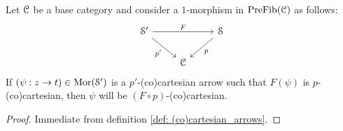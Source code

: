             \begin{proposition} \label{prop: (co)cartesian_arrows_under_1_morphisms_of_prefibrations}
                Let $\mathcal{C}$ be a base category and consider a $1$-morphism in $\mathrm{Pre}\mathrm{Fib}(\mathcal{C})$ as follows:
                    $$
                        \begin{tikzcd}
                        	{\S'} && \S \\
                        	& \C
                        	\arrow["{p'}"', from=1-1, to=2-2]
                        	\arrow["p", from=1-3, to=2-2]
                        	\arrow["F", from=1-1, to=1-3]
                        \end{tikzcd}
                    $$
                If $(\psi: z \to t) \in \mathrm{Mor}(\mathcal{S}')$ is a $p'$-(co)cartesian arrow such that $F(\psi)$ is $p$-(co)cartesian, then $\psi$ will be $(F \circ p)$-(co)cartesian. 
            \end{proposition}
                \begin{proof}
                    Immediate from definition \ref{def: (co)cartesian_arrows}.
                \end{proof}
            
